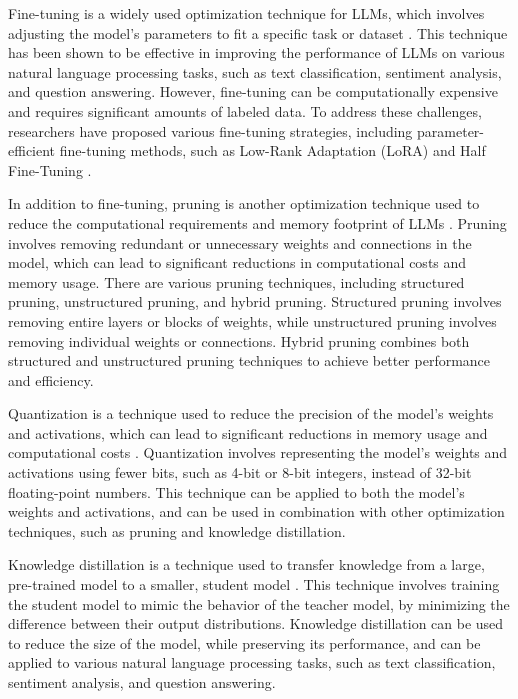 \documentclass[11pt]{article}
\begin{document}
Fine-tuning is a widely used optimization technique for LLMs, which involves adjusting the model's parameters to fit a specific task or dataset \cite{ref80}. This technique has been shown to be effective in improving the performance of LLMs on various natural language processing tasks, such as text classification, sentiment analysis, and question answering. However, fine-tuning can be computationally expensive and requires significant amounts of labeled data. To address these challenges, researchers have proposed various fine-tuning strategies, including parameter-efficient fine-tuning methods, such as Low-Rank Adaptation (LoRA) and Half Fine-Tuning \cite{ref81}.

In addition to fine-tuning, pruning is another optimization technique used to reduce the computational requirements and memory footprint of LLMs \cite{ref82}. Pruning involves removing redundant or unnecessary weights and connections in the model, which can lead to significant reductions in computational costs and memory usage. There are various pruning techniques, including structured pruning, unstructured pruning, and hybrid pruning. Structured pruning involves removing entire layers or blocks of weights, while unstructured pruning involves removing individual weights or connections. Hybrid pruning combines both structured and unstructured pruning techniques to achieve better performance and efficiency.

Quantization is a technique used to reduce the precision of the model's weights and activations, which can lead to significant reductions in memory usage and computational costs \cite{ref83}. Quantization involves representing the model's weights and activations using fewer bits, such as 4-bit or 8-bit integers, instead of 32-bit floating-point numbers. This technique can be applied to both the model's weights and activations, and can be used in combination with other optimization techniques, such as pruning and knowledge distillation.

Knowledge distillation is a technique used to transfer knowledge from a large, pre-trained model to a smaller, student model \cite{ref84}. This technique involves training the student model to mimic the behavior of the teacher model, by minimizing the difference between their output distributions. Knowledge distillation can be used to reduce the size of the model, while preserving its performance, and can be applied to various natural language processing tasks, such as text classification, sentiment analysis, and question answering.
\end{document}
